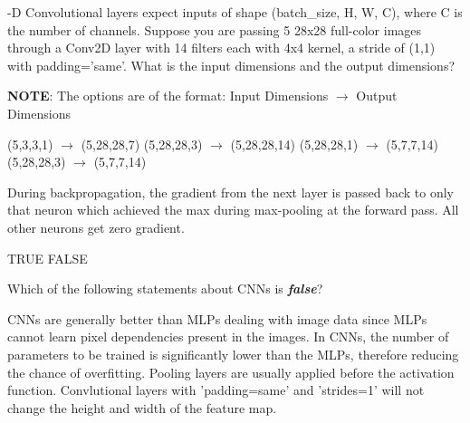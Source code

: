 \begin{questions}
    -D Convolutional layers expect inputs of shape (batch\_size, H, W, C), where C is the number of channels. 
    Suppose you are passing 5 28x28 full-color images through a Conv2D layer with 14 filters each with 4x4 kernel, a stride of (1,1) with padding='same'. What is the input dimensions and the output dimensions?
    
    \textbf{NOTE}: The options are of the format: Input Dimensions $\rightarrow$ Output Dimensions

    \begin{checkboxes}
        \choice (5,3,3,1) $\rightarrow$ (5,28,28,7)
        \choice (5,28,28,3) $\rightarrow$ (5,28,28,14)
        \choice (5,28,28,1) $\rightarrow$ (5,7,7,14)
        \choice (5,28,28,3) $\rightarrow$ (5,7,7,14)
    \end{checkboxes}
    
    \question[3] During backpropagation, the gradient from the next layer is passed back to only that neuron which achieved the max during max-pooling at the forward pass. All other neurons get zero gradient.

    \begin{checkboxes}
        \choice TRUE
        \choice FALSE
    \end{checkboxes}
    
    \question[3] Which of the following statements about CNNs is \textit{\textbf{false}}?
    
    \begin{checkboxes}
        \choice CNNs are generally better than MLPs dealing with image data since MLPs cannot learn pixel dependencies present in the images.
        \choice In CNNs, the number of parameters to be trained is significantly lower than the MLPs, therefore reducing the chance of overfitting.
        \choice Pooling layers are usually applied before the activation function.
        \choice Convlutional layers with 'padding=same' and 'strides=1' will not change the height and width of the feature map.
    \end{checkboxes}
\end{questions}


